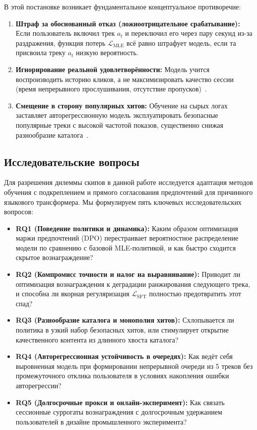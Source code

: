 В этой постановке возникает фундаментальное концептуальное противоречие:
\begin{enumerate}
    \item \textbf{Штраф за обоснованный отказ (ложноотрицательное срабатывание):} Если пользователь включил трек $a_t$ и переключил его через пару секунд из-за раздражения, функция потерь $\mathcal{L}_{\text{MLE}}$ всё равно штрафует модель, если та присвоила треку $a_t$ низкую вероятность.
    \item \textbf{Игнорирование реальной удовлетворённости:} Модель учится воспроизводить историю кликов, а не максимизировать качество сессии (время непрерывного прослушивания, отсутствие пропусков)~\cite{volkov2026session}.
    \item \textbf{Смещение в сторону популярных хитов:} Обучение на сырых логах заставляет авторегрессионную модель эксплуатировать безопасные популярные треки с высокой частотой показов, существенно снижая разнообразие каталога~\cite{petrov2024aligning}.
\end{enumerate}

\subsection{Исследовательские вопросы}
Для разрешения дилеммы скипов в данной работе исследуется адаптация методов обучения с подкреплением и прямого согласования предпочтений для причинного языкового трансформера. Мы формулируем пять ключевых исследовательских вопросов:
\begin{itemize}
    \item \textbf{RQ1 (Поведение политики и динамика):} Каким образом оптимизация маржи предпочтений (DPO) перестраивает вероятностное распределение модели по сравнению с базовой MLE-политикой, и как быстро сходится скрытое вознаграждение?
    \item \textbf{RQ2 (Компромисс точности и налог на выравнивание):} Приводит ли оптимизация вознаграждения к деградации ранжирования следующего трека, и способна ли якорная регуляризация $\mathcal{L}_{\text{SFT}}$ полностью предотвратить этот спад?
    \item \textbf{RQ3 (Разнообразие каталога и монополия хитов):} Схлопывается ли политика в узкий набор безопасных хитов, или стимулирует открытие качественного контента из длинного хвоста каталога?
    \item \textbf{RQ4 (Авторегрессионная устойчивость в очередях):} Как ведёт себя выровненная модель при формировании непрерывной очереди из 5 треков без промежуточного отклика пользователя в условиях накопления ошибки авторегрессии?
    \item \textbf{RQ5 (Долгосрочные прокси и онлайн-эксперимент):} Как связать сессионные суррогаты вознаграждения с долгосрочным удержанием пользователей в дизайне промышленного эксперимента?
\end{itemize}

